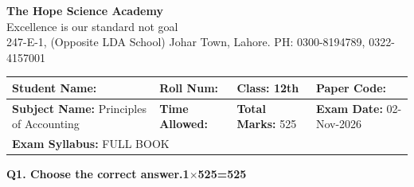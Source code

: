 \documentclass[11pt,a4paper]{article}
\begin{document}
\begin{center}
  {\Huge\bfseries The Hope Science Academy}\\[3pt]
  {\small Excellence is our standard not goal}\\[2pt]
  {\small 247-E-1, (Opposite LDA School) Johar Town, Lahore. PH: 0300-8194789, 0322-4157001}
\end{center}

\medskip
\noindent
\begin{tabularx}{\linewidth}{|X|X|X|X|}
\hline
\textbf{Student Name:} & \textbf{Roll Num:} & \textbf{Class:} 12th & \textbf{Paper Code:} \\ \hline
\textbf{Subject Name:} Principles of Accounting & \textbf{Time Allowed:} & \textbf{Total Marks:} 525 & \textbf{Exam Date:} 02-Nov-2026 \\ \hline
\multicolumn{4}{|l|}{\textbf{Exam Syllabus:} FULL BOOK} \\ \hline
\end{tabularx}

\bigskip
\noindent\textbf{Q1. Choose the correct answer.}\hfill\textbf{1$\times$525=525}
\end{document}
